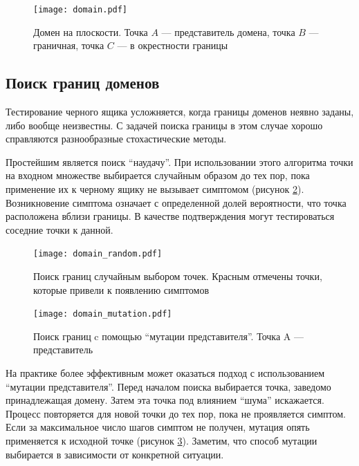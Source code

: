 \documentclass[a4paper,14pt,href]{article}
\begin{document}
\begin{figure}[htbp]
\begin{center}
	\texttt{[image: domain.pdf]}
    \caption{Домен на плоскости. Точка $A$ --- представитель домена, точка $B$ --- граничная, точка $C$ --- в окрестности границы}
    \label{fig:DomainTest}
\end{center}
\end{figure}

\subsection{Поиск границ доменов}
	Тестирование черного ящика усложняется, когда границы доменов неявно заданы, либо вообще неизвестны. С задачей поиска границы в этом случае хорошо справляются разнообразные стохастические методы\cite{BasaezFuzzing}.

	Простейшим является поиск ``наудачу''. При использовании этого алгоритма точки на входном множестве выбирается случайным образом до тех пор, пока применение их к черному ящику не вызывает симптомом (рисунок \ref{fig:DomainRandom}). Возникновение симптома означает с определенной долей вероятности, что точка расположена вблизи границы. В качестве подтверждения могут тестироваться соседние точки к данной.

\begin{figure}[htbp]
\begin{center}
	\texttt{[image: domain\_random.pdf]}
    \caption{Поиск границ случайным выбором точек. Красным отмечены точки, которые привели к появлению симптомов}
    \label{fig:DomainRandom}
\end{center}
\end{figure}

\begin{figure}[htbp]
\begin{center}
	\texttt{[image: domain\_mutation.pdf]}
    \caption{Поиск границ c помощью ``мутации представителя''. Точка A --- представитель}
    \label{fig:DomainMutation}
\end{center}
\end{figure}

	На практике более эффективным может оказаться подход с использованием ``мутации представителя''. Перед началом поиска выбирается точка, заведомо принадлежащая домену. Затем эта точка под влиянием ``шума'' искажается. Процесс повторяется для новой точки до тех пор, пока не проявляется симптом. Если за максимальное число шагов симптом не получен, мутация опять применяется к исходной точке (рисунок \ref{fig:DomainMutation}).
Заметим, что способ мутации выбирается в зависимости от конкретной ситуации.
\end{document}
